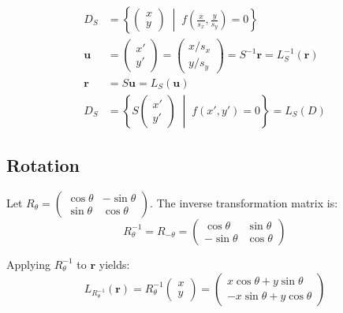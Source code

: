 \documentclass{article}
\renewcommand{\vec}[1]{\boldsymbol{#1}}
\begin{document}
\begin{align*}
  D_S &= \left\{ \begin{pmatrix} x \\ y \end{pmatrix} \;\middle|\; f\left( \frac{x}{s_x}, \frac{y}{s_y} \right) = 0 \right\} \\[1ex]
  \vec{u} &= \begin{pmatrix} x' \\ y' \end{pmatrix} = \begin{pmatrix} x / s_x \\ y / s_y \end{pmatrix} = S^{-1}\vec{r} = L_S^{-1}(\vec{r}) \\[1ex]
  \vec{r} &= S\vec{u} = L_S(\vec{u}) \\[1ex]
  D_S &= \left\{ S \begin{pmatrix} x' \\ y' \end{pmatrix} \;\middle|\; f(x', y') = 0 \right\} = L_S(D)
\end{align*}

\subsection{Rotation}

Let $R_{\theta} = \begin{pmatrix} \cos\theta & -\sin\theta \\ \sin\theta & \cos\theta \end{pmatrix}$. The inverse transformation matrix is:
\[
  R_{\theta}^{-1} = R_{-\theta} = \begin{pmatrix} \cos\theta & \sin\theta \\ -\sin\theta & \cos\theta \end{pmatrix}
\]

Applying $R_{\theta}^{-1}$ to $\vec{r}$ yields:
\[
  L_{R_{\theta}^{-1}}(\vec{r}) =  R_{\theta}^{-1} \begin{pmatrix} x \\ y \end{pmatrix} = \begin{pmatrix} x\cos\theta + y\sin\theta \\ -x\sin\theta + y\cos\theta \end{pmatrix}
\]
\end{document}
